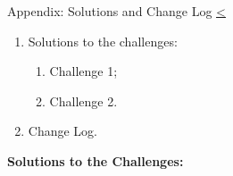 \documentclass[12pt]{extarticle}
\newenvironment{instructionblock}{\Large\bgroup}{\egroup}
\newcommand{\ben}{\begin{enumerate}}
\newcommand{\een}{\end{enumerate}}
\begin{document}





\pagebreak	
\begin{slide}{ Appendix: Solutions and Change Log }{ \hyperref[slide 15]{\textless}}
	\begin{instructionblock}
		\begin{enumerate}
			\item {Solutions to the challenges:}
				\ben
					\item Challenge 1;
					\item Challenge 2.
				\een
			\item {Change Log.}
		\end{enumerate}
	\end{instructionblock}
\end{slide}


\vspace{8mm}
\textbf{Solutions to the Challenges:}
\end{document}
